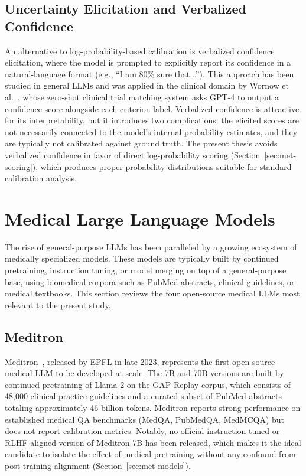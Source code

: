 \subsection{Uncertainty Elicitation and Verbalized Confidence}
\label{subsec:sota-verbalized}

An alternative to log-probability-based calibration is verbalized 
confidence elicitation, where the model is prompted to explicitly 
report its confidence in a natural-language format (e.g., ``I am 80\% 
sure that...''). This approach has been studied in general LLMs and 
was applied in the clinical domain by Wornow et 
al.~\cite{wornow2024zeroshot}, whose zero-shot clinical trial matching 
system asks GPT-4 to output a confidence score alongside each criterion 
label. Verbalized confidence is attractive for its interpretability, 
but it introduces two complications: the elicited scores are not 
necessarily connected to the model's internal probability estimates, 
and they are typically not calibrated against ground truth. The 
present thesis avoids verbalized confidence in favor of direct 
log-probability scoring (Section~\ref{sec:met-scoring}), which produces 
proper probability distributions suitable for standard calibration 
analysis.

\section{Medical Large Language Models}
\label{sec:sota-medllms}

The rise of general-purpose LLMs has been paralleled by a growing 
ecosystem of medically specialized models. These models are typically 
built by continued pretraining, instruction tuning, or model merging 
on top of a general-purpose base, using biomedical corpora such as 
PubMed abstracts, clinical guidelines, or medical textbooks. This 
section reviews the four open-source medical LLMs most relevant to 
the present study.

\subsection{Meditron}
\label{subsec:sota-meditron}

Meditron~\cite{chen2023meditron}, released by EPFL in late 2023, 
represents the first open-source medical LLM to be developed at scale. 
The 7B and 70B versions are built by continued pretraining of Llama-2 
on the GAP-Replay corpus, which consists of 48{,}000 clinical practice 
guidelines and a curated subset of PubMed abstracts totaling 
approximately 46 billion tokens. Meditron reports strong performance 
on established medical QA benchmarks (MedQA, PubMedQA, MedMCQA) but 
does not report calibration metrics. Notably, no official 
instruction-tuned or RLHF-aligned version of Meditron-7B has been 
released, which makes it the ideal candidate to isolate the effect of 
medical pretraining without any confound from post-training alignment 
(Section~\ref{sec:met-models}).

